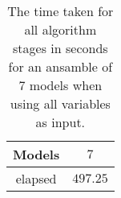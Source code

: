\begin{table}[!ht]
	\centering
	\begin{tabular}{|c|c|}
		\hline
		Models & $7$ \\ \hline
		elapsed & $497.25$ \\ \hline
	\end{tabular}
	\caption{The time taken for all algorithm stages in seconds for an ansamble of 7 models when using all variables as input.}
	\label{tab:time:ansamble:reverse:all:7}
\end{table}
